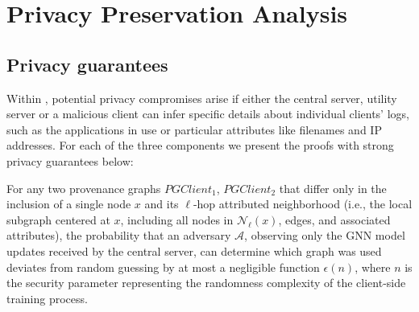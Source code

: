\section{Privacy Preservation Analysis}
\label{sec:privacy}

\subsection{Privacy guarantees}

Within \Sys, potential privacy compromises arise if either the central server, utility server or a malicious client can infer specific details about individual clients' logs, such as the applications in use or particular attributes like filenames and IP addresses. For each of the three components we present the proofs with strong privacy guarantees below:

\renewcommand{\thetheorem}{\arabic{theorem}}

\begin{theorem}
    For any two provenance graphs \(PGClient_1\), \(PGClient_2\) that differ only in the inclusion of a single node \(x\) and its \(\ell\)-hop attributed neighborhood (i.e., the local subgraph centered at \(x\), including all nodes in \(\mathcal{N}_\ell(x)\), edges, and associated attributes), the probability that an adversary \(\mathcal{A}\), observing only the GNN model updates received by the central server, can determine which graph was used deviates from random guessing by at most a negligible function \(\epsilon(n)\), where \(n\) is the security parameter representing the randomness complexity of the client-side training process.
    \end{theorem}
    
